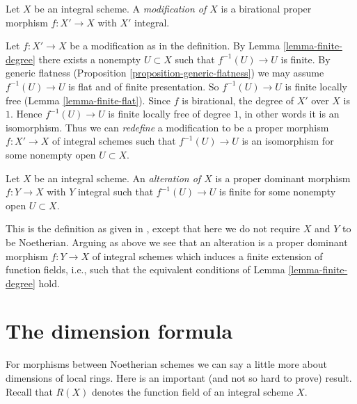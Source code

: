 \begin{definition}
\label{definition-modification}
Let $X$ be an integral scheme. A {\it modification of $X$}
is a birational proper morphism $f : X' \to X$ with $X'$
integral.
\end{definition}

\noindent
Let $f : X' \to X$ be a modification as in the definition. By
Lemma \ref{lemma-finite-degree} there exists a nonempty $U \subset X$ such
that $f^{-1}(U) \to U$ is finite. By generic flatness
(Proposition \ref{proposition-generic-flatness})
we may assume $f^{-1}(U) \to U$ is flat and of finite presentation.
So $f^{-1}(U) \to U$ is finite locally free (Lemma \ref{lemma-finite-flat}).
Since $f$ is birational, the degree of $X'$ over $X$ is $1$.
Hence $f^{-1}(U) \to U$ is finite locally free of degree $1$,
in other words it is an isomorphism. Thus we can {\it redefine} a
modification to be a proper morphism $f : X' \to X$ of integral schemes
such that $f^{-1}(U) \to U$ is an isomorphism for some nonempty open
$U \subset X$.

\begin{definition}
\label{definition-alteration}
\begin{reference}
\cite[Definition 2.20]{alterations}
\end{reference}
Let $X$ be an integral scheme. An {\it alteration of $X$}
is a proper dominant morphism $f : Y \to X$ with $Y$ integral such
that $f^{-1}(U) \to U$ is finite for some nonempty open $U \subset X$.
\end{definition}

\noindent
This is the definition as given in \cite{alterations}, except that
here we do not require $X$ and $Y$ to be Noetherian. Arguing as above
we see that an alteration is a proper dominant morphism $f : Y \to X$
of integral schemes which induces a finite extension of
function fields, i.e., such that the equivalent conditions of
Lemma \ref{lemma-finite-degree} hold.



\section{The dimension formula}
\label{section-dimension-formula}

\noindent
For morphisms between Noetherian schemes we can say a little more
about dimensions of local rings. Here is an important (and not so
hard to prove) result. Recall that $R(X)$ denotes the function field
of an integral scheme $X$.

